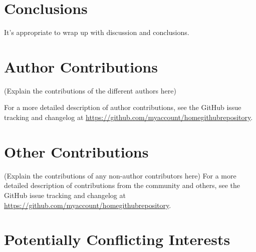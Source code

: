 \documentclass[9pt,review]{livecoms}
\newcommand{\githubrepository}{\url{https://github.com/myaccount/homegithubrepository}}  %
\begin{document}
\section{Conclusions}

It's appropriate to wrap up with discussion and conclusions.





\section*{Author Contributions}
%

(Explain the contributions of the different authors here)

For a more detailed description of author contributions,
see the GitHub issue tracking and changelog at \githubrepository.

\section*{Other Contributions}
%

(Explain the contributions of any non-author contributors here)
For a more detailed description of contributions from the community and others, see the GitHub issue tracking and changelog at \githubrepository.

\section*{Potentially Conflicting Interests}
\end{document}
